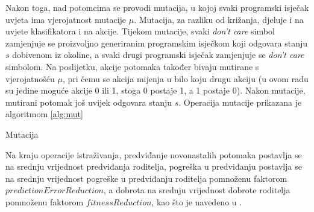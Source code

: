 \documentclass[times, utf8, zavrsni]{fer}
\begin{document}
Nakon toga, nad potomcima se provodi mutacija, u kojoj svaki programski isječak uvjeta ima vjerojatnost mutacije $\mu$.
Mutacija, za razliku od križanja, djeluje i na uvjete klasifikatora i na akcije.
Tijekom mutacije, svaki \emph{don't care} simbol zamjenjuje se proizvoljno generiranim programskim isječkom koji odgovara stanju $s$ dobivenom iz okoline, a svaki drugi programski isječak zamjenjuje se \emph{don't care} simbolom.
Na poslijetku, akcije potomaka također bivaju mutirane s vjerojatnošću $\mu$, pri čemu se akcija mijenja u bilo koju drugu akciju (u ovom radu su jedine moguće akcije 0 ili 1, stoga 0 postaje 1, a 1 postaje 0).
Nakon mutacije, mutirani potomak još uvijek odgovara stanju $s$.
Operacija mutacije prikazana je algoritmom \ref{alg:mut}
\begin{algorithm}[h]
    \caption{Mutacija}
    \label{alg:mut}
    \begin{algorithmic}
        \STATE{$r :=$ proizvoljan decimalni broj iz intervala [0, 1)}
        \REPEAT
        \ELSE
        \ENDIF
        \ENDIF
        \ENDFOR
        \STATE{$r :=$ proizvoljan decimalni broj iz intervala [0, 1)}
        \ENDIF
    \end{algorithmic}
\end{algorithm}

Na kraju operacije istraživanja, predviđanje novonastalih potomaka postavlja se na srednju vrijednost predviđanja roditelja, pogreška u predviđanju postavlja se na srednju vrijednost pogreške u predviđanju roditelja pomnoženu faktorom $predictionErrorReduction$, a dobrota na srednju vrijednost dobrote roditelja pomnoženu faktorom $fitnessReduction$, kao što je navedeno u \citep{4}.
\end{document}
